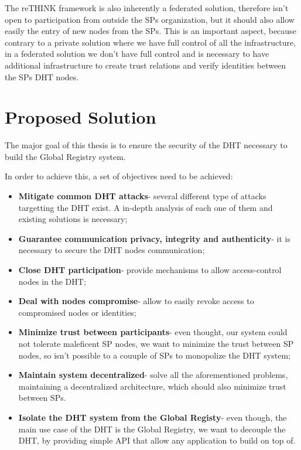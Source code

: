 The reTHINK framework is also inherently a federated solution, therefore isn't open to participation from outside the \acp{SP} organization, but it should also allow easily the entry of new nodes from the \acp{SP}.
This is an important aspect, because contrary to a private solution where we have full control of all the infrastructure, in a federated solution we don't have full control and is necessary to have additional infrastructure to create trust relations and verify identities between the \acp{SP} \ac{DHT} nodes.

\section{Proposed Solution}
\label{section:proposed}

The major goal of this thesis is to ensure the security of the \ac{DHT} necessary to build the Global Registry system.

In order to achieve this, a set of objectives need to be achieved:

\begin{itemize}
  \item \textbf{Mitigate common \ac{DHT} attacks}- several different type of attacks targetting the \ac{DHT} exist. A in-depth analysis of each one of them and existing solutions is necessary;
	\item \textbf{Guarantee communication privacy, integrity and authenticity}- it is necessary to secure the \ac{DHT} nodes communication;
	\item \textbf{Close DHT participation}- provide mechanisms to allow access-control nodes in the \ac{DHT};
	\item \textbf{Deal with nodes compromise}- allow to easily revoke access to compromised nodes or identities;
	\item \textbf{Minimize trust between participants}- even thought, our system could not tolerate maleficent \ac{SP} nodes, we want to minimize the trust between \ac{SP} nodes, so isn't possible to a couuple of \acp{SP} to monopolize the DHT system;
  \item \textbf{Maintain system decentralized}- solve all the aforementioned problems, maintaining a decentralized architecture, which should also minimize trust between \acp{SP}.
	\item \textbf{Isolate the DHT system from the Global Registy}- even though, the main use case of the DHT is the Global Registry, we want to decouple the DHT, by providing simple API that allow any application to build on top of.
\end{itemize}

